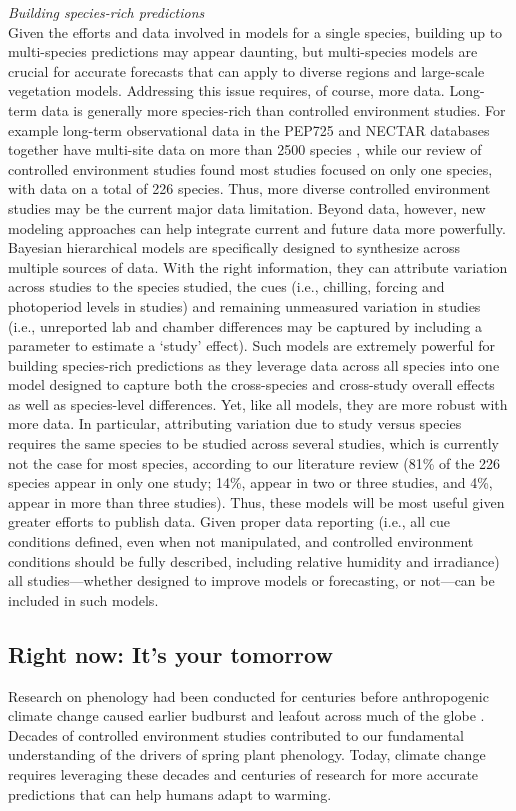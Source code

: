 \documentclass[11pt,letter]{article}
\begin{document}
\emph{Building species-rich predictions}\\
Given the efforts and data involved in models for a single species, building up to multi-species predictions may appear daunting, but multi-species models are crucial for accurate forecasts that can apply to diverse regions and large-scale vegetation models. Addressing this issue requires, of course, more data. Long-term data is generally more species-rich than controlled environment studies. For example long-term observational data in the PEP725 and NECTAR databases together have multi-site data on more than 2500 species \citep{nectar,Templ2018}, while our review of controlled environment studies found most studies focused on only one species, with data on a total of 226 species. Thus, more diverse controlled environment studies may be the current major data limitation. Beyond data, however, new modeling approaches can help integrate current and future data more powerfully. \\

Bayesian hierarchical models are specifically designed to synthesize across multiple sources of data. With the right information, they can attribute variation across studies to the species studied, the cues (i.e., chilling, forcing and photoperiod levels in studies) and remaining unmeasured variation in studies (i.e., unreported lab and chamber differences may be captured by including a parameter to estimate a `study' effect). Such models are extremely powerful for building species-rich predictions as they leverage data across all species into one model designed to capture both the cross-species and cross-study overall effects as well as species-level differences. Yet, like all models, they are more robust with more data. In particular, attributing variation due to study versus species requires the same species to be studied across several studies, which is currently not the case for most species, according to our literature review (81\% of the 226 species appear in only one study; 14\%, appear in two or  three studies, and 4\%, appear in more than three studies). Thus, these models will be most useful given greater efforts to publish data. Given proper data reporting (i.e., all cue conditions defined, even when not manipulated, and controlled environment conditions should be fully described, including relative humidity and irradiance) all studies---whether designed to improve models or forecasting, or not---can be included in such models. 

\subsection{Right now: It's your tomorrow}
Research on phenology had been conducted for centuries before anthropogenic climate change caused earlier budburst and leafout across much of the globe \citep{Lamb:1948aa,Sparks:1995mv}. Decades of controlled environment studies contributed to our fundamental understanding of the drivers of spring plant phenology. Today, climate change requires leveraging these decades and centuries of research for more accurate predictions that can help humans adapt to warming. \\
\end{document}
